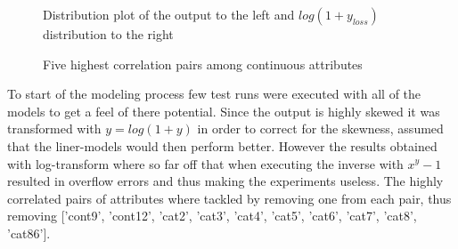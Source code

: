 \documentclass[a4paper]{article}
\begin{document}
\begin{figure}[H]
\centering
{}
\caption{Distribution plot of the output to the left and $log(1 + y_{loss})$ distribution to the right}
\label{fig:loss}
\end{figure}
\begin{figure}[H]
\centering
{}
\caption{Five highest correlation pairs among continuous attributes}
\label{fig:con-corr}
\end{figure}
To start of the modeling process few test runs were executed with all of the models to get a feel of there potential. Since the output is highly skewed it was transformed with $y=log(1 + y)$ in order to correct for the skewness, assumed that the liner-models would then perform better. However the results obtained with log-transform where so far off that when executing the inverse with $x^y - 1$ resulted in overflow errors and thus making the experiments useless.
The highly correlated pairs of attributes where tackled by removing one from each pair, thus removing ['cont9', 'cont12', 'cat2', 'cat3', 'cat4', 'cat5', 'cat6', 'cat7', 'cat8', 'cat86'].
\end{document}

